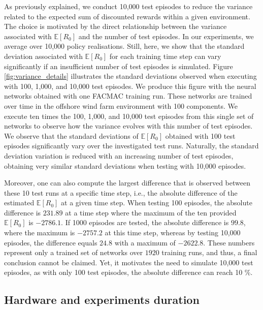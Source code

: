 As previously explained, we conduct 10,000 test episodes to reduce the variance related to the expected sum of discounted rewards within a given environment.
The choice is motivated by the direct relationship between the variance associated with $\mathbb{E}[R_{0}]$ and the number of test episodes. 
In our experiments, we average over 10,000 policy realisations. 
Still, here, we show that the standard deviation associated with $\mathbb{E}[R_{0}]$ for each training time step can vary significantly if an insufficient number of test episodes is simulated.
Figure \ref{fig:variance_details} illustrates the standard deviations observed when executing with 100, 1,000, and 10,000 test episodes.
We produce this figure with the neural networks obtained with one FACMAC training run.
These networks are trained over time in the offshore wind farm environment with 100 components.
We execute ten times the 100, 1,000, and 10,000 test episodes from this single set of networks to observe how the variance evolves with this number of test episodes.
We observe that the standard deviations of $\mathbb{E}[R_{0}]$ obtained with 100 test episodes significantly vary over the investigated test runs.
Naturally, the standard deviation variation is reduced with an increasing number of test episodes, obtaining very similar standard deviations when testing with 10,000 episodes.

Moreover, one can also compute the largest difference that is observed between these 10 test runs at a specific time step, i.e., the absolute difference of the estimated $\mathbb{E}[R_{0}]$ at a given time step.
When testing 100 episodes, the absolute difference is $231.89$ at a time step where the maximum of the ten provided $\mathbb{E}[R_{0}]$ is $ -2786.1$.
If 1000 episodes are tested, the absolute difference is $99.8$, where the maximum is $-2757.2$ at this time step, whereas by testing 10,000 episodes, the difference equals $24.8$ with a maximum of $-2622.8$.
These numbers represent only a trained set of networks over $1920$ training runs, and thus, a final conclusion cannot be claimed. 
Yet, it motivates the need to simulate 10,000 test episodes, as with only 100 test episodes, the absolute difference can reach 10 \%.


\subsection{Hardware and experiments duration}
\label{sec:ch5_appendix_duration}

